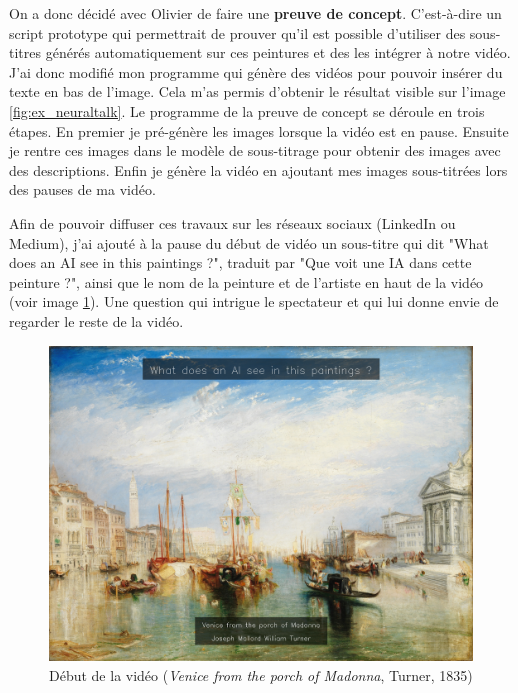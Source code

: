 \par
On a donc décidé avec Olivier de faire une \textbf{preuve de concept}. C'est-à-dire un script prototype qui permettrait de prouver qu'il est possible d'utiliser des sous-titres générés automatiquement sur ces peintures et des les intégrer à notre vidéo. J'ai donc modifié mon programme qui génère des vidéos pour pouvoir insérer du texte en bas de l'image. Cela m'as permis d'obtenir le résultat visible sur l'image \ref{fig:ex_neuraltalk}. Le programme de la preuve de concept se déroule en trois étapes. En premier je pré-génère les images lorsque la vidéo est en pause. Ensuite je rentre ces images dans le modèle de sous-titrage pour obtenir des images avec des descriptions. Enfin je génère la vidéo en ajoutant mes images sous-titrées lors des pauses de ma vidéo.

\par
Afin de pouvoir diffuser ces travaux sur les réseaux sociaux (LinkedIn ou Medium), j'ai ajouté à la pause du début de vidéo un sous-titre qui dit "What does an AI see in this paintings ?", traduit par "Que voit une IA dans cette peinture ?", ainsi que le nom de la peinture et de l'artiste en haut de la vidéo (voir image \ref{fig:title_screen}). Une question qui intrigue le spectateur et qui lui donne envie de regarder le reste de la vidéo.

\begin{figure}[ht]
  \centering
  \includegraphics[width=0.7\linewidth]{datas/title_screen.png}
  \caption{Début de la vidéo (\emph{Venice from the porch of Madonna}, Turner, 1835)}
  \label{fig:title_screen}
\end{figure}

